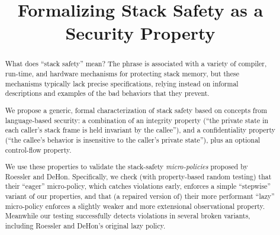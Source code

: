 \documentclass[10pt,conference]{ieeetran}%
\theoremstyle{definition}
\begin{document}
\title{Formalizing Stack Safety as a Security Property}




\ifcameraready
{}  %
\fi

\maketitle

\begin{abstract}

What does ``stack safety'' mean? The phrase is associated with a
variety of compiler,
run-time, and hardware mechanisms for protecting stack
memory, but these mechanisms typically lack precise specifications,
relying instead on informal descriptions and examples of the bad
behaviors that they prevent.

We propose a generic, formal characterization
of stack safety based on concepts from language-based security: a
combination of an integrity property (``the private
state in each caller's stack frame is held invariant by the callee''),
and a confidentiality property (``the callee's behavior is insensitive to the
caller's private state''), plus an optional control-flow property.

We use these properties to validate the stack-safety {\em micro-policies}
proposed by Roessler and DeHon. %
Specifically, we check (with
property-based random testing) that their ``eager''
micro-policy, which catches violations early, enforces a
simple ``stepwise'' variant of our properties, and that
(a repaired version of) their more performant
``lazy'' micro-policy enforces a slightly weaker and more extensional
observational property. Meanwhile our testing successfully detects violations
in several broken variants, including Roessler and DeHon's original lazy policy.

\end{abstract}
\end{document}
